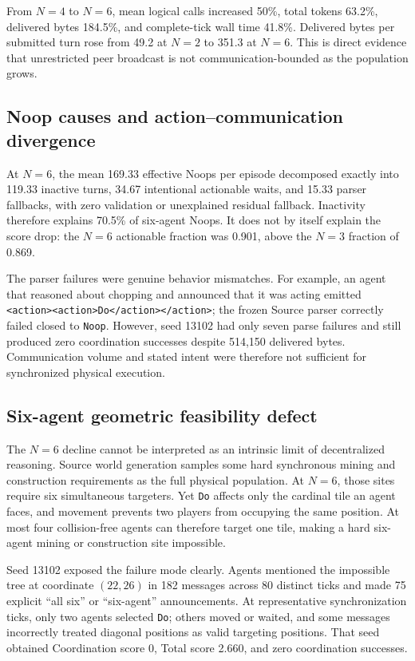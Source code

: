 \documentclass[11pt]{article}
\newcommand{\code}[1]{\texttt{#1}}
\begin{document}
From $N=4$ to $N=6$, mean logical calls increased 50\%, total tokens 63.2\%,
delivered bytes 184.5\%, and complete-tick wall time 41.8\%.  Delivered bytes
per submitted turn rose from 49.2 at $N=2$ to 351.3 at $N=6$.  This is direct
evidence that unrestricted peer broadcast is not communication-bounded as the
population grows.

\subsection{Noop causes and action--communication divergence}

At $N=6$, the mean 169.33 effective Noops per episode decomposed exactly into
119.33 inactive turns, 34.67 intentional actionable waits, and 15.33 parser
fallbacks, with zero validation or unexplained residual fallback.  Inactivity
therefore explains 70.5\% of six-agent Noops.  It does not by itself explain
the score drop: the $N=6$ actionable fraction was 0.901, above the $N=3$
fraction of 0.869.

The parser failures were genuine behavior mismatches.  For example, an agent
that reasoned about chopping and announced that it was acting emitted
\code{<action><action>Do</action></action>}; the frozen Source parser correctly
failed closed to \code{Noop}.  However, seed 13102 had only seven parse
failures and still produced zero coordination successes despite 514,150
delivered bytes.  Communication volume and stated intent were therefore not
sufficient for synchronized physical execution.

\subsection{Six-agent geometric feasibility defect}

The $N=6$ decline cannot be interpreted as an intrinsic limit of decentralized
reasoning.  Source world generation samples some hard synchronous mining and
construction requirements as the full physical population.  At $N=6$, those
sites require six simultaneous targeters.  Yet \code{Do} affects only the
cardinal tile an agent faces, and movement prevents two players from occupying
the same position.  At most four collision-free agents can therefore target
one tile, making a hard six-agent mining or construction site impossible.

Seed 13102 exposed the failure mode clearly.  Agents mentioned the impossible
tree at coordinate $(22,26)$ in 182 messages across 80 distinct ticks and made
75 explicit ``all six'' or ``six-agent'' announcements.  At representative
synchronization ticks, only two agents selected \code{Do}; others moved or
waited, and some messages incorrectly treated diagonal positions as valid
targeting positions.  That seed obtained Coordination score 0, Total score
2.660, and zero coordination successes.
\end{document}
